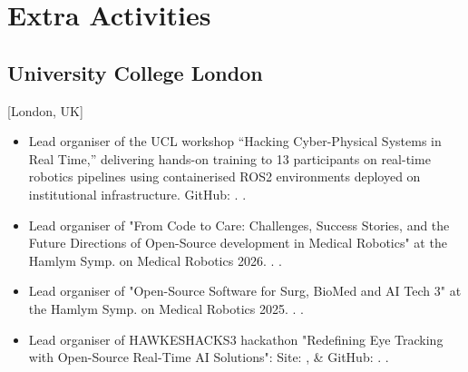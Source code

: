 \documentclass{mycv}
\begin{document}
\section{Extra Activities}

\subsection{University College London}[London, UK]
\vspace{1mm}
\begin{positions}
\end{positions}
\begin{itemize}

\item
	Lead organiser of the UCL workshop “Hacking Cyber-Physical Systems in Real Time,” 
	delivering hands-on training to 13 participants on real-time robotics pipelines using containerised ROS2 environments 
	deployed on institutional infrastructure. 
	GitHub: \href{https://github.com/UCL-CyberPhysicalSystems/hackathon-01}{\faGithub*}.
	.

\item Lead organiser of "From Code to Care: Challenges, Success Stories, and the Future Directions of Open-Source development in Medical Robotics" at the Hamlym Symp. on Medical Robotics 2026.
	\href{https://www.hamlynsymposium.org/events/from-code-to-care-challenges-success-stories-and-the-future-directions-of-open-source-development-in-medical-robotics/}{\faExternalLink*}.
	.

\item Lead organiser of "Open-Source Software for Surg, BioMed and AI Tech 3" at the Hamlym Symp. on Medical Robotics 2025.
	\href{https://www.hamlynsymposium.org/events/healing-through-collaboration-open-source-software-in-surgical-biomedical-and-ai-technologies/}{\faExternalLink*}.
	.

\item Lead organiser of HAWKESHACKS3 hackathon "Redefining Eye Tracking with Open-Source Real-Time AI Solutions":
	Site: \href{https://cmic-ucl.github.io/CMICHACKS/}{\faExternalLink*}, \&
	GitHub: \href{https://github.com/oocular/ready/tree/main/docs/hackathons/hawkes2024}{\faGithub*}.
	.


\end{itemize}
\end{document}
